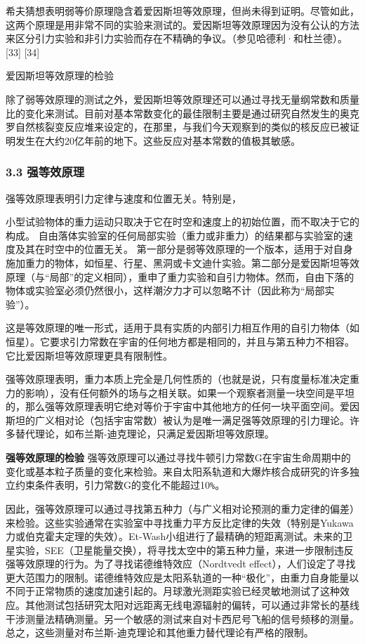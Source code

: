 希夫猜想表明弱等价原理隐含着爱因斯坦等效原理，但尚未得到证明。尽管如此，这两个原理是用非常不同的实验来测试的。爱因斯坦等效原理因为没有公认的方法来区分引力实验和非引力实验而存在不精确的争议。（参见哈德利·和杜兰德）。[33] [34]


\textbf{}{爱因斯坦等效原理的检验}

除了弱等效原理的测试之外，爱因斯坦等效原理还可以通过寻找无量纲常数和质量比的变化来测试。目前对基本常数变化的最佳限制主要是通过研究自然发生的奥克罗自然核裂变反应堆来设定的，在那里，与我们今天观察到的类似的核反应已被证明发生在大约20亿年前的地下。这些反应对基本常数的值极其敏感。




\subsubsection{3.3 强等效原理}

强等效原理表明引力定律与速度和位置无关。特别是，

小型试验物体的重力运动只取决于它在时空和速度上的初始位置，而不取决于它的构成。
自由落体实验室的任何局部实验（重力或非重力）的结果都与实验室的速度及其在时空中的位置无关。
第一部分是弱等效原理的一个版本，适用于对自身施加重力的物体，如恒星、行星、黑洞或卡文迪什实验。第二部分是爱因斯坦等效原理（与“局部”的定义相同），重申了重力实验和自引力物体。然而，自由下落的物体或实验室必须仍然很小，这样潮汐力才可以忽略不计（因此称为“局部实验”）。

这是等效原理的唯一形式，适用于具有实质的内部引力相互作用的自引力物体（如恒星）。它要求引力常数在宇宙的任何地方都是相同的，并且与第五种力不相容。它比爱因斯坦等效原理更具有限制性。

强等效原理表明，重力本质上完全是几何性质的（也就是说，只有度量标准决定重力的影响），没有任何额外的场与之相关联。如果一个观察者测量一块空间是平坦的，那么强等效原理表明它绝对等价于宇宙中其他地方的任何一块平面空间。爱因斯坦的广义相对论（包括宇宙常数）被认为是唯一满足强等效原理的引力理论。许多替代理论，如布兰斯-迪克理论，只满足爱因斯坦等效原理。

\textbf{强等效原理的检验}
强等效原理可以通过寻找牛顿引力常数G在宇宙生命周期中的变化或基本粒子质量的变化来检验。来自太阳系轨道和大爆炸核合成研究的许多独立约束条件表明，引力常数G的变化不能超过10\verb|%|。

因此，强等效原理可以通过寻找第五种力（与广义相对论预测的重力定律的偏差）来检验。这些实验通常在实验室中寻找重力平方反比定律的失效（特别是Yukawa力或伯克霍夫定理的失效）。Et-Wash小组进行了最精确的短距离测试。未来的卫星实验，SEE（卫星能量交换），将寻找太空中的第五种力量，来进一步限制违反强等效原理的行为。为了寻找诺德维特效应（Nordtvedt effect），人们设定了寻找更大范围力的限制。诺德维特效应是太阳系轨道的一种“极化”，由重力自身能量以不同于正常物质的速度加速引起的。月球激光测距实验已经灵敏地测试了这种效应。其他测试包括研究太阳对远距离无线电源辐射的偏转，可以通过非常长的基线干涉测量法精确测量。另一个敏感的测试来自对卡西尼号飞船的信号频移的测量。总之，这些测量对布兰斯-迪克理论和其他重力替代理论有严格的限制。

